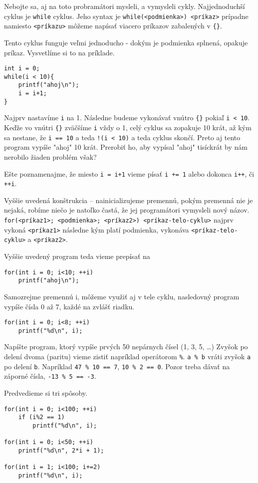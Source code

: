 Nebojte sa, aj na toto probramátori mysleli, a vymysleli cykly.  Najjednoduchší
cyklus je \verb!while! cyklus. Jeho syntax je 
\verb!while(<podmienka>) <príkaz>! prípadne namiesto \verb!<príkazu>! 
môžeme napísať viacero príkazov zabalených v \verb!{}!.

Tento cyklus funguje veľmi jednoducho - dokým je podmienka splnená, opakuje
príkaz. Vysvetlíme si to na príklade.
\begin{lstlisting}
int i = 0;
while(i < 10){
    printf("ahoj\n");
    i = i+1;
}
\end{lstlisting}
Najprv nastavíme \verb!i! na 1. Následne budeme vykonávať vnútro \verb!{}! pokiaľ 
\verb!i < 10!. Keďže vo vnútri \verb!{}! zväčšíme \verb!i! vždy o 1, celý cyklus sa zopakuje
10 krát, až kým sa nestane, že \verb!i == 10! a teda \verb'!(i < 10)' a teda cyklus
skončí.  Preto aj tento program vypíše "ahoj" 10 krát. Prerobiť ho, aby vypísal
"ahoj" tisíckrát by nám nerobilo žiaden problém však?

Ešte poznamenajme, že miesto \verb!i = i+1! vieme písať \verb!i += 1! alebo
dokonca \verb!i++!, či \verb!++i!.

\medskip

Vyššie uvedená konštrukcia -- nainicializujeme premennú, pokým premenná nie je
nejaká, robíme niečo je natoľko častá, že jej programátori vymysleli nový
názov. \verb!for(<príkaz1>; <podmienka>; <príkaz2>) <príkaz-telo-cyklu>! najprv
vykoná \verb!<príkaz1>! následne kým platí podmienka, vykonáva
\verb!<príkaz-telo-cyklu>! a \verb!<príkaz2>!.

Vyššie uvedený program teda vieme prepísať na
\begin{lstlisting}
for(int i = 0; i<10; ++i)
    printf("ahoj\n");
\end{lstlisting}

Samozrejme premennú i, môžeme využiť aj v tele cyklu, nasledovný program vypíše
čísla 0 až 7, každé na zvlášť riadku.
\begin{lstlisting}
for(int i = 0; i<8; ++i)
    printf("%d\n", i);
\end{lstlisting}

\cvicenie Napíšte program, ktorý vypíše prvých 50 nepárnych čísel (1, 3,
5, \dots) Zvyšok po delení dvoma (paritu) vieme zistiť napríklad operátorom \verb!%!.
\verb!a % b! vráti zvyšok \verb!a! po delení \verb!b!. Napríklad \verb!47 % 10 == 7!, \verb!10 % 2 == 0!.
Pozor treba dávať na záporné čísla, \verb!-13 % 5 == -3!.

\riesenie Predvedieme si tri spôsoby. 
\begin{lstlisting}
for(int i = 0; i<100; ++i)
    if (i%2 == 1)
        printf("%d\n", i);

for(int i = 0; i<50; ++i)
    printf("%d\n", 2*i + 1);

for(int i = 1; i<100; i+=2)
    printf("%d\n", i);
\end{lstlisting}

